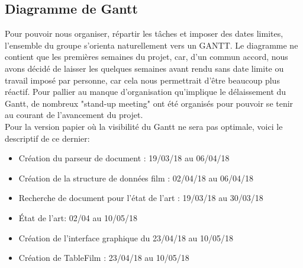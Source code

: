 \documentclass{article}
\begin{document}
\newpage
\subsection{Diagramme de Gantt}
Pour pouvoir nous organiser, répartir les tâches et imposer des dates limites, l'ensemble du groupe s'orienta naturellement vers un GANTT. 
Le diagramme ne contient que les premières semaines du projet, car, d'un commun accord, nous avons décidé de laisser les quelques semaines avant rendu sans date limite ou travail imposé par personne, car cela nous permettrait d'être beaucoup plus réactif. Pour pallier au manque d'organisation qu'implique le délaissement du Gantt, de nombreux "stand-up meeting" ont été organisés pour pouvoir se tenir au courant de l'avancement du projet.\\
Pour la version papier où la visibilité du Gantt ne sera pas optimale, voici le descriptif de ce dernier:

\begin{itemize}
        \item Création du parseur de document : 19/03/18 au 06/04/18
        \item Création de la structure de données film : 02/04/18 au 06/04/18
        \item Recherche de document pour l'état de l'art : 19/03/18 au 30/03/18
        \item État de l'art: 02/04 au 10/05/18
        \item Création de l'interface graphique du 23/04/18 au 10/05/18
        \item Création de TableFilm : 23/04/18 au 10/05/18
\end{itemize}
\end{document}
